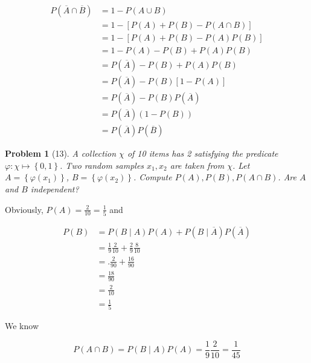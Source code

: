 \documentclass[a4paper, 12pt]{article}
\newtheorem{problem}{Problem}
\newtheorem{problem}{Problem}
\begin{document}
  \begin{align*}
      P(\overline{A} \cap \overline{B}) &= 1 - P(A \cup B) \\
                                        &=1 - \left[ P(A) + P(B) - P(A \cap B) \right]  \\ 
                                        &=1 - \left[ P(A) + P(B) - P(A)P(B) \right] \\ 
                                        &=1 - P(A) - P(B) + P(A)P(B) \\ 
                                        &=P(\overline{A}) - P(B) + P(A)P(B) \\ 
                                        &=P(\overline{A}) - P(B)\left[1 - P(A) \right]  \\ 
                                        &=P(\overline{A}) - P(B)P(\overline{A}) \\ 
                                        &=P(\overline{A})(1 -P(B)) \\ 
                                        &=P(\overline{A})P(\overline{B})
  \end{align*}

  \pagebreak 

  \begin{problem}[13]
      A collection $\chi$ of 10 items has 2 satisfying the predicate $\varphi : \chi \mapsto \left\{ 0, 1 \right\} $.  
      Two random samples $x_1, x_2$ are taken from $\chi$. Let $A = \left\{ \varphi(x_1) \right\} $, $B = \left\{ \varphi(x_2) \right\} $.
      Compute $P(A), P(B), P(A \cap B)$. Are $A$ and $B$ independent?
  \end{problem}

  Obviously, $P(A) = \frac{2}{10} = \frac{1}{5}$ and 

  \begin{align*}
      P(B) &= P(B \mid A)P(A) + P(B \mid \overline{A})P(\overline{A}) \\ 
           &= \frac{1}{9} \frac{2}{10} + \frac{2}{9} \frac{8}{10} \\ 
           &=.\frac{2}{90} + \frac{16}{90} \\ 
           &=\frac{18}{90} \\ 
           &= \frac{2}{10} \\ 
           &= \frac{1}{5}
  \end{align*}

  We know 

  \begin{equation*}
      P(A \cap B) = P(B \mid A)P(A) = \frac{1}{9} \frac{2}{10} = \frac{1}{45}
  \end{equation*}
\end{document}
